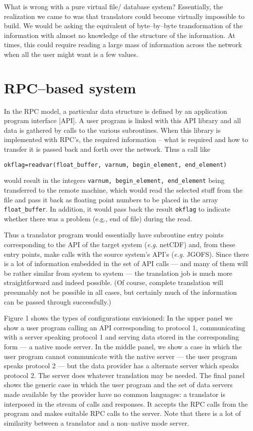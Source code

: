 \ni What is wrong with a pure virtual file/ database system?
Essentially, the realization we came to was that translators could
become virtually impossible to build. We would be asking the
equivalent of byte--by--byte transformation of the information with
almost no knowledge of the structure of the information. At times,
this could require reading a large mass of information across the
network when all the user might want is a few values.

\section{RPC--based system}

In the RPC model, a particular data structure is defined by an
application program interface [API]. A user program is linked with
this API library and all data is gathered by calls to the various
subroutines. When this library is implemented with RPC's, the
required information -- what is required and how to transfer it is
passed back and forth over the network. Thus a call like

\smallskip
{\tt okflag=readvar(float\_buffer, varnum, begin\_element, end\_element)}
\smallskip

\ni would result in the integers {\tt varnum, begin\_element,
end\_element} being transferred to the remote machine, which would
read the selected stuff from the file and pass it back as floating
point numbers to be placed in the array {\tt float\_buffer}. In
addition, it would pass back the result {\tt okflag} to indicate
whether there was a problem (e.g., end of file) during the read.

Thus a translator program would essentially have subroutine entry
points corresponding to the API of the target system ({\sl e.g.}
netCDF) and, from these entry points, make calls with the source
system's API's ({\sl e.g.} JGOFS). Since there is a lot of
information embedded in the set of API calls --- and many of them will
be rather similar from system to system --- the translation job is
much more straightforward and indeed possible. (Of course, complete
translation will presumably not be possible in all cases, but
certainly much of the information can be passed through successfully.)

Figure 1 shows the types of configurations envisioned: In the upper
panel we show a user program calling an API corresponding to protocol
1, communicating with a server speaking protocol 1 and serving data
stored in the corresponding form --- a native mode server. In the
middle panel, we show a case in which the user program cannot
communicate with the native server --- the user program speaks
protocol 2 --- but the data provider has a alternate server which
speaks protocol 2. The server does whatever translation may be needed.
The final panel shows the generic case in which the user program and
the set of data servers made available by the provider have no common
languages: a translator is interposed in the stream of calls and
responses. It accepts the RPC calls from the program and makes
suitable RPC calls to the server. Note that there is a lot of
similarity between a translator and a non--native mode server.

